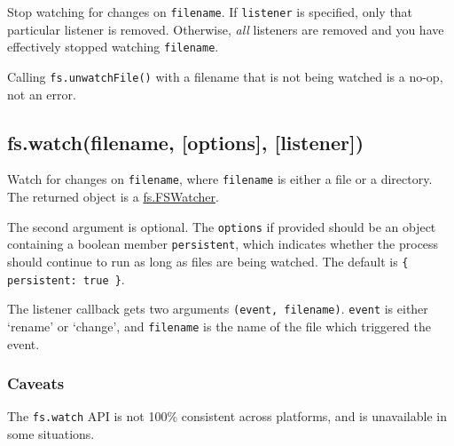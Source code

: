 \begin{Shaded}
\begin{Highlighting}[]
\NormalTok{: } \NormalTok{- }  
\end{Highlighting}
\end{Shaded}

Stop watching for changes on \texttt{filename}. If \texttt{listener} is
specified, only that particular listener is removed. Otherwise,
\emph{all} listeners are removed and you have effectively stopped
watching \texttt{filename}.

Calling \texttt{fs.unwatchFile()} with a filename that is not being
watched is a no-op, not an error.

\subsection{fs.watch(filename, {[}options{]}, {[}listener{]})}

\begin{Shaded}
\begin{Highlighting}[]
\NormalTok{: } \NormalTok{- }
\end{Highlighting}
\end{Shaded}

Watch for changes on \texttt{filename}, where \texttt{filename} is
either a file or a directory. The returned object is a
\hyperref[fs\_class\_fs\_fswatcher]{fs.FSWatcher}.

The second argument is optional. The \texttt{options} if provided should
be an object containing a boolean member \texttt{persistent}, which
indicates whether the process should continue to run as long as files
are being watched. The default is \texttt{\{ persistent: true \}}.

The listener callback gets two arguments \texttt{(event, filename)}.
\texttt{event} is either `rename' or `change', and \texttt{filename} is
the name of the file which triggered the event.

\subsubsection{Caveats}

The \texttt{fs.watch} API is not 100\% consistent across platforms, and
is unavailable in some situations.

